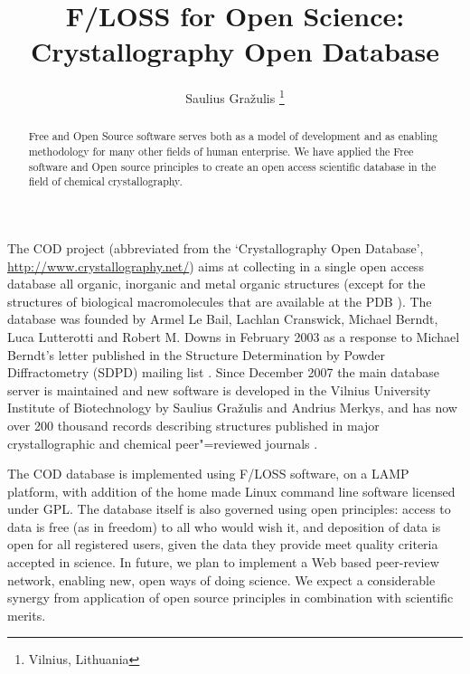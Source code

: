 \documentclass[10pt, a5paper]{article}
\begin{document}
\title{F/LOSS for Open Science: Crystallography Open Database}
\author{Saulius Gražulis \footnote{Vilnius, Lithuania}}
\maketitle
\begin{abstract}
Free and Open Source software serves both as a model of development and as enabling methodology for many other fields of human enterprise. We have applied the Free software and Open source principles to create an open access scientific database in the field of chemical crystallography.
\end{abstract}
The COD project (abbreviated from the `Crystallography Open Database', \url{http://www.crystallography.net/}) aims at collecting in a single open access database all organic, inorganic and metal organic structures \cite{graz1} (except for the structures of biological macromolecules that are available at the PDB \cite{graz2}). The database was founded by Armel Le Bail, Lachlan Cranswick, Michael Berndt, Luca Lutterotti and Robert M. Downs in February 2003 as a response to Michael Berndt’s letter published in the Structure Determination by Powder Diffractometry (SDPD) mailing list \cite{graz3}. Since December 2007 the main database server is maintained and new software is developed in the Vilnius University Institute of Biotechnology by Saulius Gražulis and Andrius Merkys, and has now over 200 thousand records describing structures published in major crystallographic and chemical peer"=reviewed journals \cite{graz4}.

The COD database is implemented using F/LOSS software, on a LAMP platform, with addition of the home made Linux command line software licensed under GPL. The database itself is also governed using open principles: access to data is free (as in freedom) to all who would wish it, and deposition of data is open for all registered users, given the data they provide meet quality criteria accepted in science. In future, we plan to implement a Web based peer-review network, enabling new, open ways of doing science. We expect a considerable synergy from application of open source principles in combination with scientific merits.
\end{document}
